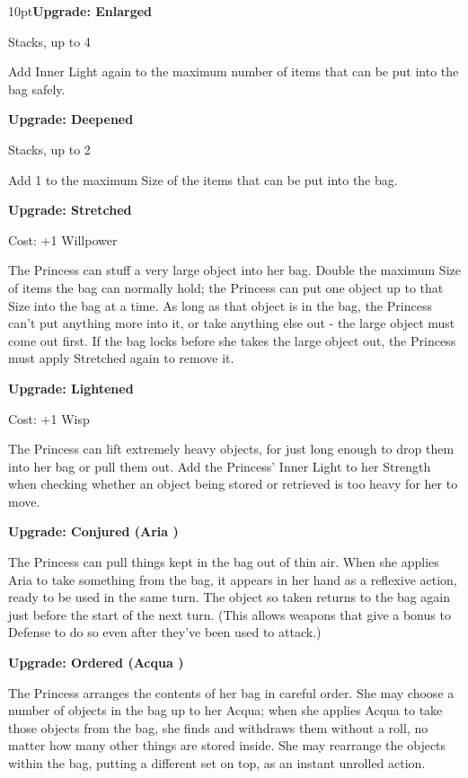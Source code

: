 \begin{myindentpar}{10pt}\textbf{Upgrade: Enlarged}

Stacks, up to 4

Add Inner Light again to the maximum number of items that can be put into the bag safely.

\textbf{Upgrade: Deepened}

Stacks, up to 2

Add 1 to the maximum Size of the items that can be put into the bag.

\textbf{Upgrade: Stretched}

\noindent Cost: +1 Willpower

The Princess can stuff a very large object into her bag. Double the maximum Size of items the bag can normally hold; the Princess can put one object up to that Size into the bag at a time. As long as that object is in the bag, the Princess can't put anything more into it, or take anything else out - the large object must come out first. If the bag locks before she takes the large object out, the Princess must apply Stretched again to remove it.

\textbf{Upgrade: Lightened}

\noindent Cost: +1 Wisp

The Princess can lift extremely heavy objects, for just long enough to drop them into her bag or pull them out. Add the Princess' Inner Light to her Strength when checking whether an object being stored or retrieved is too heavy for her to move.

\textbf{Upgrade: Conjured (Aria \textbullet\textbullet)}

The Princess can pull things kept in the bag out of thin air. When she applies Aria to take something from the bag, it appears in her hand as a reflexive action, ready to be used in the same turn. The object so taken returns to the bag again just before the start of the next turn. (This allows weapons that give a bonus to Defense to do so even after they've been used to attack.)

\textbf{Upgrade: Ordered (Acqua \textbullet\textbullet)}

The Princess arranges the contents of her bag in careful order. She may choose a number of objects in the bag up to her Acqua; when she applies Acqua to take those objects from the bag, she finds and withdraws them without a roll, no matter how many other things are stored inside. She may rearrange the objects within the bag, putting a different set on top, as an instant unrolled action.\end{myindentpar}

